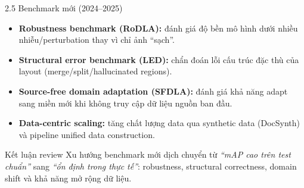 \documentclass[aspectratio=1610,8pt]{beamer}
\begin{document}
\begin{frame}{2.5 \; Benchmark mới (2024--2025)}
    \small
    \begin{itemize}
        \item \textbf{Robustness benchmark (RoDLA):} đánh giá độ bền mô hình dưới nhiều nhiễu/perturbation thay vì chỉ ảnh ``sạch''\cite{dla_2024_cvpr_2024_rodla_benchmarking_the_robustness_of_document_layout_analysis_mod}.
        \item \textbf{Structural error benchmark (LED):} chẩn đoán lỗi cấu trúc đặc thù của layout (merge/split/hallucinated regions)\cite{dla_2025_arxiv_led_benchmark_diagnosing_structural_layout_errors_for_document_layout}.
        \item \textbf{Source-free domain adaptation (SFDLA):} đánh giá khả năng adapt sang miền mới khi không truy cập dữ liệu nguồn ban đầu\cite{dla_2025_arxiv_sfdla_source_free_document_layout_analysis_pdf}.
        \item \textbf{Data-centric scaling:} tăng chất lượng data qua synthetic data (DocSynth) và pipeline unified data construction\cite{dla_2024_arxiv_doclayout_yolo_enhancing_document_layout_analysis_through_diverse_syn,dla_2025_arxiv_pp_doclayout_a_unified_document_layout_detection_model_to_accelerate_}.
    \end{itemize}

    \vspace{0.4em}
    \begin{block}{Kết luận review}
        Xu hướng benchmark mới dịch chuyển từ \textit{``mAP cao trên test chuẩn''} sang \textit{``ổn định trong thực tế''}: robustness, structural correctness, domain shift và khả năng mở rộng dữ liệu.
    \end{block}
\end{frame}
\end{document}
